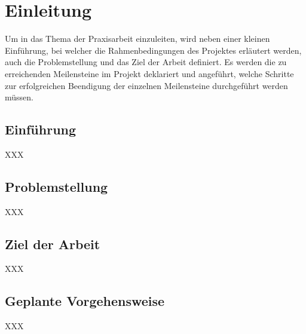 \chapter{Einleitung}
Um in das Thema der Praxisarbeit einzuleiten, wird neben einer kleinen Einführung, bei welcher die Rahmenbedingungen des Projektes erläutert werden, auch die Problemstellung und das Ziel der Arbeit definiert. Es werden die zu erreichenden Meilensteine im Projekt deklariert und angeführt, welche Schritte zur erfolgreichen Beendigung der einzelnen Meilensteine durchgeführt werden müssen.

\section{Einführung}
XXX

\section{Problemstellung}
XXX

\section{Ziel der Arbeit}
XXX

\section{Geplante Vorgehensweise}
XXX
